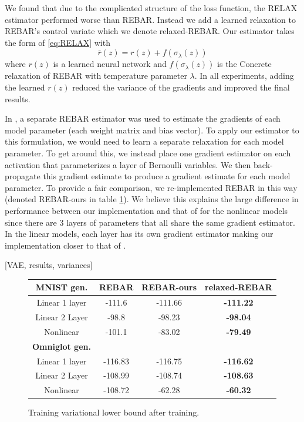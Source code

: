\documentclass{article}
\newcommand{\relaxed}{r}
\begin{document}
We found that due to the complicated structure of the loss function, the RELAX estimator performed worse than REBAR. Instead we add a learned relaxation to REBAR's control variate which we denote relaxed-REBAR. Our estimator takes the form of \ref{eq:RELAX} with $$\bar \relaxed(z) = \relaxed(z) + f(\sigma_\lambda(z))$$ where $\relaxed(z)$ is a learned neural network and $f(\sigma_\lambda(z))$ is the Concrete relaxation of REBAR with temperature parameter $\lambda$. In all experiments, adding the learned $\relaxed(z)$ reduced the variance of the gradients and improved the final results. 

In \citep{tucker2017rebar}, a separate REBAR estimator was used to estimate the gradients of each model parameter (each weight matrix and bias vector). To apply our estimator to this formulation, we would need to learn a separate relaxation for each model parameter. To get around this, we instead place one gradient estimator on each activation that parameterizes a layer of Bernoulli variables. We then back-propagate this gradient estimate to produce a gradient estimate for each model parameter. To provide a fair comparison, we re-implemented REBAR in this way (denoted REBAR-ours in table \ref{tab:vae}). We believe this explains the large difference in performance between our implementation and that of \citep{tucker2017rebar} for the nonlinear models since there are 3 layers of parameters that all share the same gradient estimator. In the linear models, each layer has its own gradient estimator making our implementation closer to that of \citep{tucker2017rebar}.



[VAE, results, variances]
\begin{figure}
\begin{center}
 \begin{tabular}{|c|c c c||} 
 \hline
 \textbf{MNIST gen.} & REBAR \citep{tucker2017rebar} & REBAR-ours & relaxed-REBAR \\ [0.5ex] 
 \hline
 Linear 1 layer   & -111.6 & -111.66 & \textbf{-111.22} \\ 
 Linear 2 Layer & -98.8  & -98.23 & \textbf{-98.04} \\
 Nonlinear         & -101.1  &  -83.02 &  \textbf{-79.49} \\
 \hline\hline
 \textbf{Omniglot gen.} &&&\\
 \hline
 Linear 1 layer   & -116.83  & -116.75 & \textbf{-116.62} \\ 
 Linear 2 Layer & -108.99  & -108.74 & \textbf{-108.63} \\
 Nonlinear         & -108.72  & -62.28 & \textbf{-60.32} \\
 \hline
\end{tabular}
\end{center}
\label{tab:vae}
\caption{Training variational lower bound after training.}
\end{figure}
\end{document}
